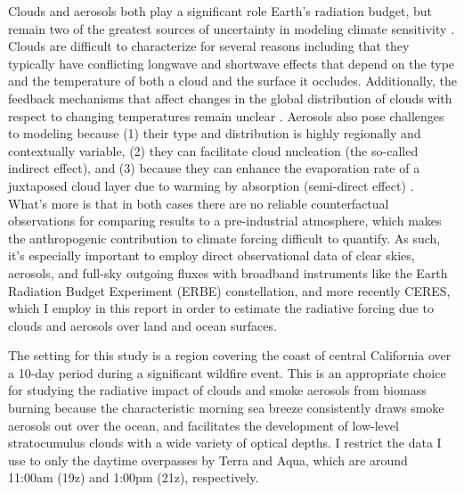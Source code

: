 \documentclass[12pt]{article}
\begin{document}
    Clouds and aerosols both play a significant role Earth's radiation budget, but remain two of the greatest sources of uncertainty in modeling climate sensitivity \cite{masson-delmotte_climate_2021}. Clouds are difficult to characterize for several reasons including that they typically have conflicting longwave and shortwave effects that depend on the type and the temperature of both a cloud and the surface it occludes. Additionally, the feedback mechanisms that affect changes in the global distribution of clouds with respect to changing temperatures remain unclear \cite{ramanathan_cloud-radiative_1989}. Aerosols also pose challenges to modeling because (1) their type and distribution is highly regionally and contextually variable, (2) they can facilitate cloud nucleation (the so-called indirect effect), and (3) because they can enhance the evaporation rate of a juxtaposed cloud layer due to warming by absorption (semi-direct effect) \cite{kaufman_satellite_2002}. What's more is that in both cases there are no reliable counterfactual observations for comparing results to a pre-industrial atmosphere, which makes the anthropogenic contribution to climate forcing difficult to quantify. As such, it's especially important to employ direct observational data of clear skies, aerosols, and full-sky outgoing fluxes with broadband instruments like the Earth Radiation Budget Experiment (ERBE) constellation, and more recently CERES, which I employ in this report in order to estimate the radiative forcing due to clouds and aerosols over land and ocean surfaces.

    The setting for this study is a region covering the coast of central California over a 10-day period during a significant wildfire event. This is an appropriate choice for studying the radiative impact of clouds and smoke aerosols from biomass burning because the characteristic morning sea breeze consistently draws smoke aerosols out over the ocean, and facilitates the development of low-level stratocumulus clouds with a wide variety of optical depths. I restrict the data I use to only the daytime overpasses by Terra and Aqua, which are around 11:00am (19z) and 1:00pm (21z), respectively.
\end{document}
